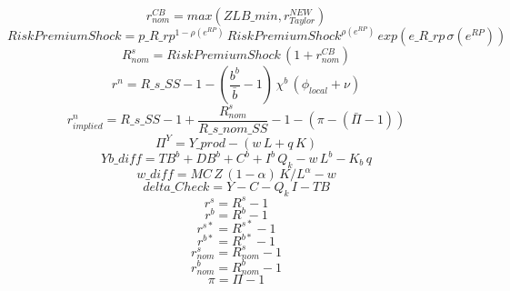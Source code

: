 \documentclass[10pt,a4paper]{article}
\begin{document}
\begin{dmath}
 r^{CB}_{nom}=max(ZLB\_min, r_{Taylor}^{NEW} )
\end{dmath}
\begin{dmath}
 Risk Premium Shock =p\_R\_rp^{1-\rho(e^{RP}) }\,  Risk Premium Shock ^{\rho(e^{RP}) }\, exp\left(e\_R\_rp\, \sigma(e^{RP}) \right)
\end{dmath}
\begin{dmath}
 R^s_{nom}= Risk Premium Shock \, \left(1+ r^{CB}_{nom}\right)
\end{dmath}
\begin{dmath}
 r^n =R\_s\_SS-1-\left(\frac{b^b}{ \bar{b} }-1\right)\, \chi^b \, \left(\phi_{local}+\nu \right)
\end{dmath}
\begin{dmath}
r^n_{implied}=R\_s\_SS-1+\frac{ R^s_{nom}}{R\_s\_nom\_SS}-1-\left( \pi -\left( \bar{\Pi} -1\right)\right)
\end{dmath}
\begin{dmath}
\Pi^Y=Y\_prod-\left(w\, L+q\, K\right)
\end{dmath}
\begin{dmath}
Yb\_diff=TB^b+DB^b+C^b+I^b\,  Q_k -w\, L^b-K_b\, q
\end{dmath}
\begin{dmath}
w\_diff=MC\, Z\, \left(1-\alpha \right)\, K/L^{\alpha }-w
\end{dmath}
\begin{dmath}
delta\_Check=Y-C- Q_k \, I-TB
\end{dmath}
\begin{dmath}
r^s=R^s-1
\end{dmath}
\begin{dmath}
r^b=R^b-1
\end{dmath}
\begin{dmath}
r^{s*}=R^{s*}-1
\end{dmath}
\begin{dmath}
r^{b*}=R^{b*}-1
\end{dmath}
\begin{dmath}
 r^s_{nom}= R^s_{nom}-1
\end{dmath}
\begin{dmath}
 r^b_{nom}= R^b_{nom}-1
\end{dmath}
\begin{dmath}
 \pi = \Pi -1
\end{dmath}
\end{document}
